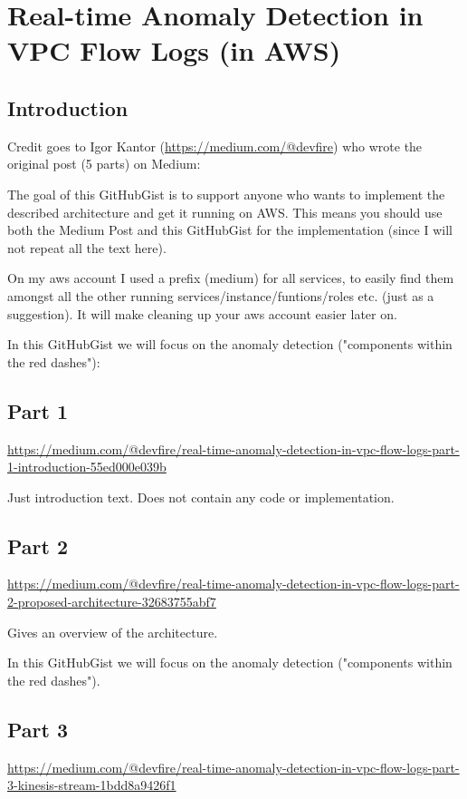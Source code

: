 \chapter{Real-time Anomaly Detection in VPC Flow Logs (in AWS)} \label{appendix-medium}

\section{Introduction}
Credit goes to Igor Kantor (\scriptsize{\url{https://medium.com/@devfire}}) who wrote the original post (5 parts) on Medium:

The goal of this GitHubGist is to support anyone who wants to implement the described architecture and get it running on AWS.
This means you should use both the Medium Post and this GitHubGist for the implementation (since I will not repeat all the text here).

On my aws account I used a prefix (medium) for all services, to easily find them amongst all the other running services/instance/funtions/roles etc. (just as a suggestion). It will make cleaning up your aws account easier later on.


In this GitHubGist we will focus on the anomaly detection ("components within the red dashes"):


\section{Part 1}
\scriptsize{\url{https://medium.com/@devfire/real-time-anomaly-detection-in-vpc-flow-logs-part-1-introduction-55ed000e039b}}

Just introduction text. Does not contain any code or implementation.


\section{Part 2}
\scriptsize{\url{https://medium.com/@devfire/real-time-anomaly-detection-in-vpc-flow-logs-part-2-proposed-architecture-32683755abf7}}

Gives an overview of the architecture.

In this GitHubGist we will focus on the anomaly detection ("components within the red dashes").


\section{Part 3}
\scriptsize{\url{https://medium.com/@devfire/real-time-anomaly-detection-in-vpc-flow-logs-part-3-kinesis-stream-1bdd8a9426f1}}

